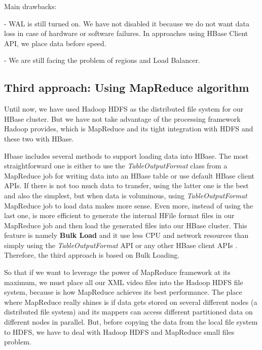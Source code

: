 Main drawbacks:
\par
- WAL is still turned on. We have not disabled it because we do not want data loss in case of hardware or software failures. In approaches using HBase Client API, we place data before speed.
\par
- We are still facing the problem of regions and Load Balancer.



\subsection{Third approach: Using MapReduce algorithm}


Until now, we have used Hadoop HDFS as the distributed file system for our HBase cluster. But we have not take advantage of the processing framework Hadoop provides, which is MapReduce and its tight integration with HDFS and these two with HBase.
 \par
Hbase includes several methods to support loading data into HBase. The most straightforward one is either to use the \textit{TableOutputFormat} class from a MapReduce job for writing data into an HBase table or use default HBase client APIs. If there is not too much data to transfer, using the latter one is the best and also the simplest, but when data is voluminous, using \textit{TableOutputFormat} MapReduce job to load data makes more sense. Even more, instead of using the last one, is more efficient to generate the internal HFile format files in our MapReduce job and then load the generated files into our HBase cluster. This feature is namely \textbf{Bulk Load} and it use less CPU and network resources than simply using the \textit{TableOutputFormat} API or any other HBase client APIs \cite{ApacheHBaseBulkLoad}. Therefore, the third approach is based on Bulk Loading.
\par
So that if we want to leverage the power of MapReduce framework at its maximum, we must place all our XML video files into the Hadoop HDFS file system, because is how MapReduce achieves its best performance. The place where MapReduce really shines is if data gets stored on several different nodes (a distributed file system) and its mappers can access different partitioned data on different nodes in parallel. But, before copying the data from the local file system to HDFS, we have to deal with Hadoop HDFS and MapReduce small files problem.

